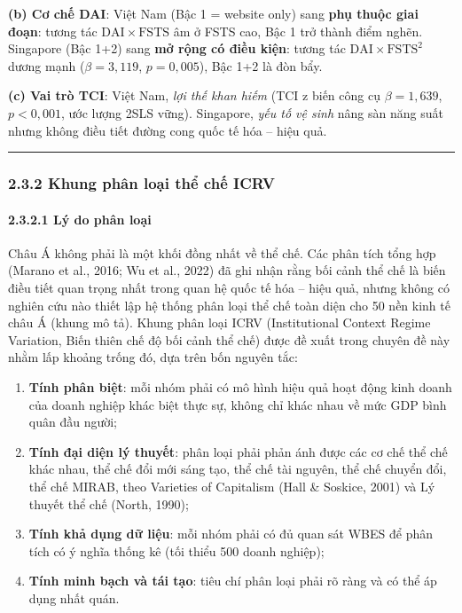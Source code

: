 \documentclass[
  a4paper,
  13pt]{extreport}
\begin{document}
\textbf{(b) Cơ chế DAI}: Việt Nam (Bậc 1 = website only) sang
\textbf{phụ thuộc giai đoạn}: tương tác
\(\mathrm{DAI}\times\mathrm{FSTS}\) âm ở FSTS cao, Bậc 1 trở thành điểm
nghẽn. Singapore (Bậc 1+2) sang \textbf{mở rộng có điều kiện}: tương tác
\(\mathrm{DAI}\times\mathrm{FSTS}^2\) dương mạnh (\(\beta=3{,}119\),
\(p=0{,}005\)), Bậc 1+2 là đòn bẩy.

\textbf{(c) Vai trò TCI}: Việt Nam, \emph{lợi thế khan hiếm} (TCI z biến
công cụ \(\beta=1{,}639\), \(p<0{,}001\), ước lượng 2SLS vững).
Singapore, \emph{yếu tố vệ sinh} nâng sàn năng suất nhưng không điều
tiết đường cong quốc tế hóa -- hiệu quả.

\begin{center}\rule{0.5\linewidth}{0.5pt}\end{center}

\hypertarget{khung-phuxe2n-loux1ea1i-thux1ec3-chux1ebf-icrv}{%
\subsubsection{2.3.2 Khung phân loại thể chế
ICRV}\label{khung-phuxe2n-loux1ea1i-thux1ec3-chux1ebf-icrv}}

\hypertarget{luxfd-do-phuxe2n-loux1ea1i}{%
\paragraph{2.3.2.1 Lý do phân loại}\label{luxfd-do-phuxe2n-loux1ea1i}}

Châu Á không phải là một khối đồng nhất về thể chế. Các phân tích tổng
hợp (Marano et al., 2016; Wu et al., 2022) đã ghi nhận rằng bối cảnh thể
chế là biến điều tiết quan trọng nhất trong quan hệ quốc tế hóa -- hiệu
quả, nhưng không có nghiên cứu nào thiết lập hệ thống phân loại thể chế
toàn diện cho 50 nền kinh tế châu Á (khung mô tả). Khung phân loại ICRV
(Institutional Context Regime Variation, Biến thiên chế độ bối cảnh thể
chế) được đề xuất trong chuyên đề này nhằm lấp khoảng trống đó, dựa trên
bốn nguyên tắc:

\begin{enumerate}
\def\labelenumi{(\alph{enumi})}
\item
  \textbf{Tính phân biệt}: mỗi nhóm phải có mô hình hiệu quả hoạt động
  kinh doanh của doanh nghiệp khác biệt thực sự, không chỉ khác nhau về
  mức GDP bình quân đầu người;
\item
  \textbf{Tính đại diện lý thuyết}: phân loại phải phản ánh được các cơ
  chế thể chế khác nhau, thể chế đổi mới sáng tạo, thể chế tài nguyên,
  thể chế chuyển đổi, thể chế MIRAB, theo Varieties of Capitalism (Hall
  \& Soskice, 2001) và Lý thuyết thể chế (North, 1990);
\item
  \textbf{Tính khả dụng dữ liệu}: mỗi nhóm phải có đủ quan sát WBES để
  phân tích có ý nghĩa thống kê (tối thiểu 500 doanh nghiệp);
\item
  \textbf{Tính minh bạch và tái tạo}: tiêu chí phân loại phải rõ ràng và
  có thể áp dụng nhất quán.
\end{enumerate}
\end{document}
